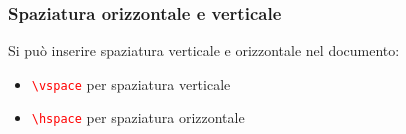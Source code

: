 \begin{frame}
  \frametitle{Spaziatura orizzontale e verticale}
  
  Si può inserire spaziatura verticale e orizzontale nel documento:
  \begin{itemize}
   \item \textcolor{red}{\texttt{\textbackslash vspace}} per spaziatura 
verticale
   \item \textcolor{red}{\texttt{\textbackslash hspace}} per spaziatura 
orizzontale
  \end{itemize}

\end{frame}
